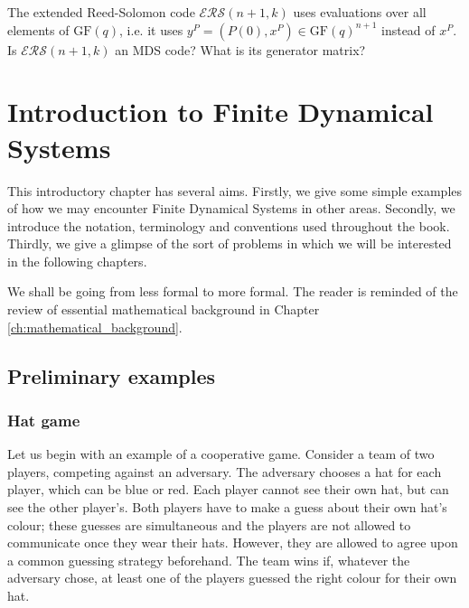 \documentclass[a4paper, 11pt]{book}
\numberwithin{equation}{section}
\theoremstyle{plain}
\newcommand{\GF}{\mathrm{GF}}
\renewcommand{\(}{\ldbrack}
\renewcommand{\)}{\rdbrack}
\begin{document}
\begin{exercises}
\begin{exercises}
	\item The extended Reed-Solomon code $\mathcal{ERS}(n+1,k)$ uses evaluations over all elements of $\GF(q)$, i.e. it uses $y^P = (P(0), x^P) \in \GF(q)^{n+1}$ instead of $x^P$. Is $\mathcal{ERS}(n+1,k)$ an MDS code? What is its generator matrix?
\end{exercises}









\end{exercises}


\chapter{Introduction to Finite Dynamical Systems} \label{ch:introduction}




This introductory chapter has several aims. Firstly, we give some simple examples of how we may encounter Finite Dynamical Systems in other areas. Secondly, we introduce the notation, terminology and conventions used throughout the book. Thirdly, we give a glimpse of the sort of problems in which we will be interested in the following chapters.

We shall be going from less formal to more formal. The reader is reminded of the review of essential mathematical background in Chapter \ref{ch:mathematical_background}.




\section{Preliminary examples} \label{sec:preliminary examples}

\subsection{Hat game} \label{sec:hat_game_example}

Let us begin with an example of a cooperative game. Consider a team of two players, competing against an adversary. The adversary chooses a hat for each player, which can be blue or red. Each player cannot see their own hat, but can see the other player's. Both players have to make a guess about their own hat's colour; these guesses are simultaneous and the players are not allowed to communicate once they wear their hats. However, they are allowed to agree upon a common guessing strategy beforehand. The team wins if, whatever the adversary chose, at least one of the players guessed the right colour for their own hat.
\end{document}
